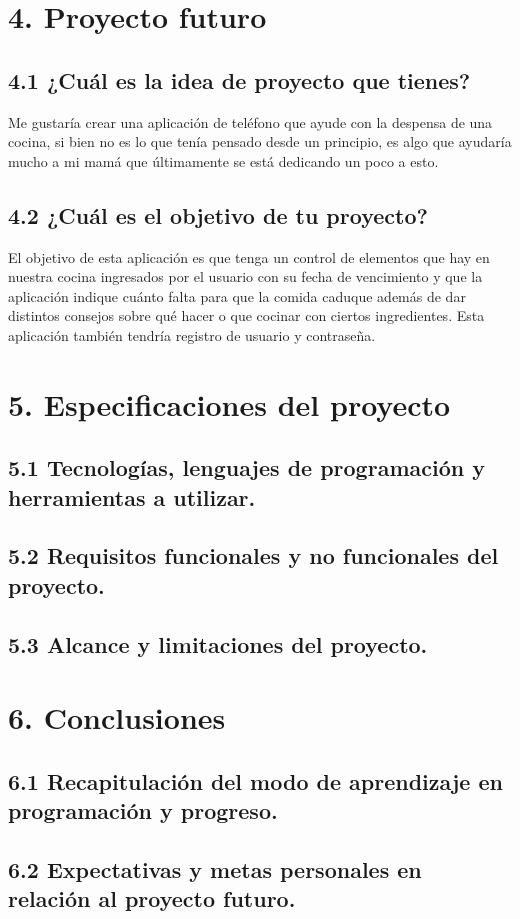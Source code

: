 \documentclass{article}
\begin{document}
\section*{4. Proyecto futuro}

\subsection*{4.1 ¿Cuál es la idea de proyecto que tienes?}
Me gustaría crear una aplicación de teléfono que ayude con la despensa de una cocina, si bien no es lo que tenía pensado desde un principio, es algo que ayudaría mucho a mi mamá que últimamente se está dedicando un poco a esto.

\subsection*{4.2 ¿Cuál es el objetivo de tu proyecto?}
El objetivo de esta aplicación es que tenga un control de elementos que hay en nuestra cocina ingresados por el usuario con su fecha de vencimiento y que la aplicación indique cuánto falta para que la comida caduque además de dar distintos consejos sobre qué   hacer o que cocinar con ciertos ingredientes. Esta aplicación también tendría registro de usuario y contraseña.

\section*{5. Especificaciones del proyecto}

\subsection*{5.1 Tecnologías, lenguajes de programación y herramientas a utilizar.}

\subsection*{5.2 Requisitos funcionales y no funcionales del proyecto.}

\subsection*{5.3 Alcance y limitaciones del proyecto.}

\section*{6. Conclusiones}

\subsection*{6.1 Recapitulación del modo de aprendizaje en programación y progreso.}

\subsection*{6.2 Expectativas y metas personales en relación al proyecto futuro.}
\end{document}
